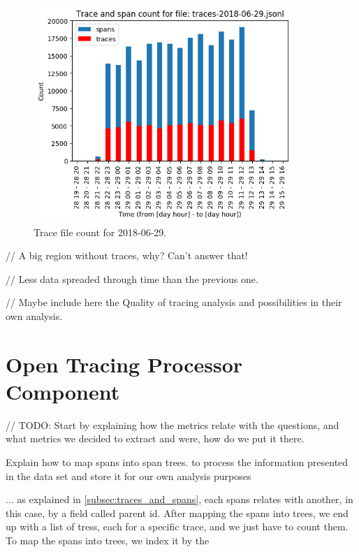 \begin{figure}[H]
    \centering
    \includegraphics[width=0.88\textwidth]{images/trace_file_count_2018_06_29_chart.png}
    \caption{Trace file count for 2018-06-29.}
    \label{fig:trace_file_count_2018_06_29}
\end{figure}

// A big region without traces, why? Can't answer that!

// Less data spreaded through time than the previous one.

// Maybe include here the Quality of tracing analysis and possibilities in their own analysis.


\section{Open Tracing Processor Component}
\label{sec:open_tracing_processor_component}

// TODO: Start by explaining how the metrics relate with the questions, and what metrics we decided to extract and were, how do we put it there.

Explain how to map spans into span trees.
to process the information presented in the data set and store it for our own analysis purposes

... as explained in \ref{subsec:traces_and_spans}, each spans relates with another, in this case, by a field called parent id. After mapping the spans into trees, we end up with a list of tress, each for a specific trace, and we just have to count them. To map the spans into trees, we index it by the 


